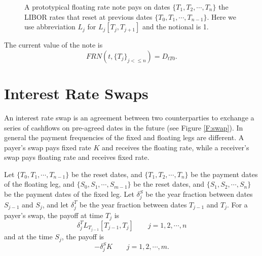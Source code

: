 \begin{figure}
  \caption{A prototypical floating rate note pays on dates 
           $\{T_1,T_2,\cdots,T_{n}\}$ the LIBOR rates that reset at previous 
           dates $\{T_0,T_1,\cdots,T_{n-1}\}$. Here we use
           abbreviation $L_j$ for $L_j[T_j,T_{j+1}]$ and the notional is 1. }
\end{figure}

The current value of the note is
\begin{equation}
  FRN(t,\{T_j\}_{j<\le n}) = D_{tT0}.
\end{equation}


\section{Interest Rate Swaps}
An interest rate swap is an agreement between two counterparties
to exchange a series of cashflows on pre-agreed dates in the future (see Figure
\ref{F:swap}). In general the payment frequencies of the fixed and floating legs
are different. A payer's swap pays fixed rate $K$ and receives the floating rate, 
while a receiver's swap pays floating rate and receives fixed rate.

Let $\{T_0,T_1,\cdots,T_{n-1}\}$ be the reset dates, and
$\{T_1,T_2,\cdots,T_{n}\}$ be the payment dates of the floating leg, and
$\{S_0,S_1,\cdots,S_{m-1}\}$ be the reset dates, and
$\{S_1,S_2,\cdots,S_{n}\}$ be the payment dates of the fixed leg. 
Let $\delta^S_j$ be the year fraction between dates $S_{j-1}$ and $S_{j}$,
and let $\delta^T_{j}$ be the year fraction between dates $T_{j-1}$ and 
$T_{j}$. For a payer's swap, the payoff at time $T_j$ is
\[
  \delta^T_j L_{T_{j-1}}[T_{j-1},T_j]  \qquad j=1,2,\cdots,n
\]
and at the time $S_j$, the payoff is
\[
  - \delta^S_j K  \qquad j=1,2,\cdots,m.
\]

